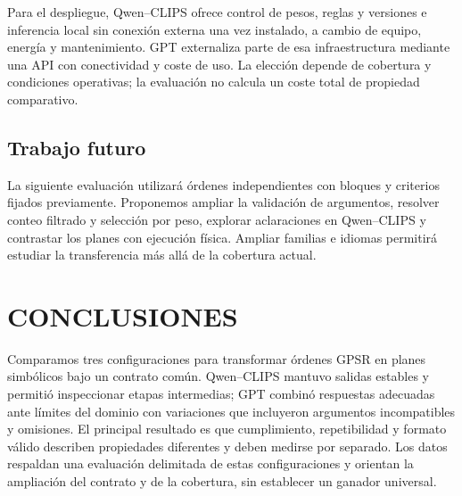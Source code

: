 \documentclass[a4paper,twoside]{article}
\begin{document}
Para el despliegue, Qwen--CLIPS ofrece control de pesos, reglas y versiones e inferencia local sin conexión externa una vez instalado, a cambio de equipo, energía y mantenimiento. GPT externaliza parte de esa infraestructura mediante una API con conectividad y coste de uso. La elección depende de cobertura y condiciones operativas; la evaluación no calcula un coste total de propiedad comparativo.

\subsection{Trabajo futuro}
La siguiente evaluación utilizará órdenes independientes con bloques y criterios fijados previamente. Proponemos ampliar la validación de argumentos, resolver conteo filtrado y selección por peso, explorar aclaraciones en Qwen--CLIPS y contrastar los planes con ejecución física. Ampliar familias e idiomas permitirá estudiar la transferencia más allá de la cobertura actual.

\section{CONCLUSIONES}
Comparamos tres configuraciones para transformar órdenes GPSR en planes simbólicos bajo un contrato común. Qwen--CLIPS mantuvo salidas estables y permitió inspeccionar etapas intermedias; GPT combinó respuestas adecuadas ante límites del dominio con variaciones que incluyeron argumentos incompatibles y omisiones. El principal resultado es que cumplimiento, repetibilidad y formato válido describen propiedades diferentes y deben medirse por separado. Los datos respaldan una evaluación delimitada de estas configuraciones y orientan la ampliación del contrato y de la cobertura, sin establecer un ganador universal.






\end{document}
